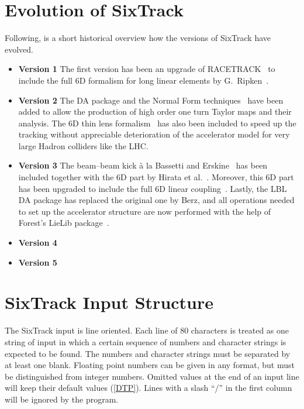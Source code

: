 \section{Evolution of SixTrack}

Following, is a short historical overview how the versions of SixTrack have evolved.
\begin{itemize}
  \item {\bf Version 1}
        The first version has been an upgrade of RACETRACK~\cite{RACETRACK} to include the full 6D formalism for long linear elements by G.~Ripken~\cite{Ripken85}.
  \item {\bf Version 2}
        The DA package and the Normal Form techniques~\cite{Berz89,Forest89} have been added to allow the production of high order one turn Taylor maps and their analysis.
        The 6D thin lens formalism~\cite{Ripken95} has also been included to speed up the tracking without appreciable deterioration of the accelerator model for very large Hadron colliders like the LHC.
  \item {\bf Version 3}
        The beam--beam kick \`a la Bassetti and Erskine~\cite{BasErs} has been included together with the 6D part by Hirata et al.~\cite{Hirata}.
        Moreover, this 6D part has been upgraded to include the full 6D linear coupling~\cite{ripbeam}.
        Lastly, the LBL DA package has replaced the original one by Berz, and all operations needed to set up the accelerator structure are now performed with the help of Forest's LieLib package~\cite{DALIE}.
  \item {\bf Version 4}
  \item {\bf Version 5}
\end{itemize}

\section{SixTrack Input Structure}

The SixTrack input is line oriented.
Each line of 80 characters is treated as one string of input in which a certain sequence of numbers and character strings is expected to be found.
The numbers and character strings must be separated by at least one blank.
Floating point numbers can be given in any format, but must be distinguished from integer numbers.
Omitted values at the end of an input line will keep their default values (\ref{DTP}).
Lines with a slash ``/'' in the first column will be ignored by the program.

